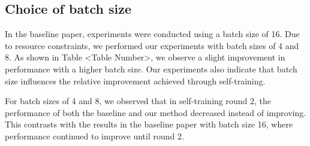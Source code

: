 \subsection{Choice of batch size}
In the baseline paper, experiments were conducted using a batch size of 16. Due to resource constraints, we performed our experiments with batch sizes of 4 and 8. As shown in Table <Table Number>, we observe a slight improvement in performance with a higher batch size. Our experiments also indicate that batch size influences the relative improvement achieved through self-training.

For batch sizes of 4 and 8, we observed that in self-training round 2, the performance of both the baseline and our method decreased instead of improving. This contrasts with the results in the baseline paper with batch size 16, where performance continued to improve until round 2.

